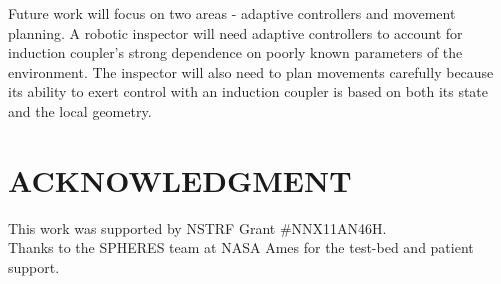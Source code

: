\documentclass[letterpaper, 10 pt, conference]{ieeeconf}  %
\begin{document}
\par Future work will focus on two areas - adaptive controllers and movement planning. A robotic inspector will need adaptive controllers to account for induction coupler's strong dependence on poorly known parameters of the environment.  The inspector will also need to plan movements carefully because its ability to exert control with an induction coupler is based on both its state and the local geometry.      





   


\addtolength{\textheight}{-12cm}   %








\section*{ACKNOWLEDGMENT}
This work was supported by NSTRF Grant $\#$NNX11AN46H.\\
Thanks to the SPHERES team at NASA Ames for the test-bed and patient support. 







\end{document}
